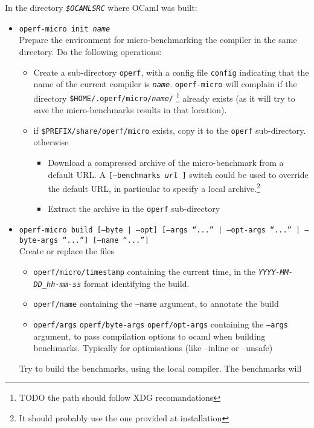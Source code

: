 \documentclass[11pt,a4paper]{article}
\begin{document}
In the directory {\tt\em \$OCAMLSRC} where OCaml was built:
\begin{itemize}
\item {\tt operf-micro init {\em name}}\\ Prepare the environment
  for micro-benchmarking the compiler in the same directory.
  Do the following operations:
  \begin{itemize}
  \item Create a sub-directory {\tt operf}, with a config file {\tt config}
  indicating that the name of the current compiler is {\tt\em name}.
  {\tt operf-micro} will complain if the directory
  {\tt \$HOME/.operf/micro/{\em name}/} \footnote{TODO the path should
    follow XDG recomandations} already exists (as it will try to
  save the micro-benchmarks results in that location).
  \item
    if {\tt \$PREFIX/share/operf/micro} exists, copy it to the
    {\tt operf} sub-directory.\\
    otherwise
    \begin{itemize}
    \item Download a compressed archive of the micro-benchmark from a
      default URL. A {\tt [--benchmarks {\em url} ]} switch could be
      used to override the default URL, in particular to specify a
      local archive.\footnote{It should probably use the one provided
        at installation}
    \item Extract the archive in the {\tt operf} sub-directory
    \end{itemize}
  \end{itemize}
\item {\tt operf-micro build [--byte | --opt] [--args ``...'' | --opt-args ``...'' | --byte-args ``...''] [--name ``...'']}\\
  Create or replace the files
  \begin{itemize}
  \item {\tt operf/micro/timestamp} containing the current time, in the
    {\tt\em YYYY-MM-DD\_hh-mm-ss} format identifying the build.
  \item {\tt operf/name} containing the {\tt --name} argument, to
    annotate the build
  \item {\tt operf/args} {\tt operf/byte-args} {\tt operf/opt-args}
    containing the {\tt --args} argument, to pass compilation options
    to ocaml when building benchmarks. Typically for optimisations
    (like --inline or --unsafe)
  \end{itemize}
  Try to build the benchmarks, using the local compiler. The benchmarks will

\end{itemize}
\end{document}
